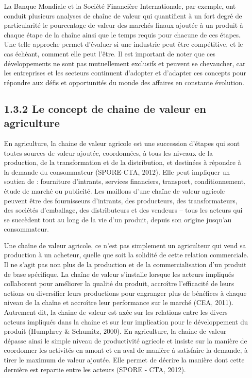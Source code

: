 \documentclass[12pt,oneside]{report}
\begin{document}
La Banque Mondiale et la Société Financière Internationale, par exemple, ont conduit plusieurs analyses de chaîne de valeur qui quantifient à un fort degré de particularité le pourcentage de valeur des marchés finaux ajoutée à un produit à chaque étape de la chaîne ainsi que le temps requis pour chacune de ces étapes. Une telle approche permet d'évaluer si une industrie peut être compétitive, et le cas échéant, comment elle peut l'être. Il est important de noter que ces développements ne sont pas mutuellement exclusifs et peuvent se chevaucher, car les entreprises et les secteurs continuent d'adopter et d'adapter ces concepts pour répondre aux défis et opportunités du monde des affaires en constante évolution.

\subsection{1.3.2 Le concept de chaine de valeur en agriculture}
En agriculture, la chaine de valeur agricole est une succession d’étapes qui sont toutes sources de valeur ajoutée, coordonnées, à tous les niveaux de la production, de la transformation et de la distribution, et destinées à répondre à la demande du consommateur (SPORE-CTA, 2012). Elle peut impliquer un soutien de : fourniture d’intrants, services financiers, transport, conditionnement, étude de marché ou publicité. Les maillons d’une chaîne de valeur agricole peuvent être des fournisseurs d’intrants, des producteurs, des transformateurs, des sociétés d’emballage, des distributeurs et des vendeurs – tous les acteurs qui se succèdent tout au long de la vie d’un produit, depuis son origine jusqu’au consommateur.

Une chaîne de valeur agricole, ce n’est pas simplement un agriculteur qui vend sa production à un acheteur, quelle que soit la solidité de cette relation commerciale. Il ne s’agit pas non plus de la production et de la commercialisation d’un produit de base spécifique. La chaîne de valeur s’installe lorsque les acteurs impliqués collaborent pour améliorer la qualité du produit, accroître l’efficacité de leurs actions ou diversifier leurs productions pour engranger plus de bénéfices à chaque niveau de la chaîne et accroître leur performance sur le marché (CEA, 2011). Autrement dit, la chaine de valeur est axée sur les relations entre les divers acteurs impliqués dans la chaine et sur leur implication pour le développement du produit (Humphrey \& Schumitz, 2000). En agriculture, la chaine de valeur dépasse ainsi le simple niveau de productivité agricole et insiste sur la manière de coordonner les activités en amont et en aval de manière à satisfaire la demande, à tirer le maximum de valeur ajoutée. Elle permet de décrire la manière dont cette dernière est repartie entre les acteurs (SPORE - CTA, 2012).
\end{document}
